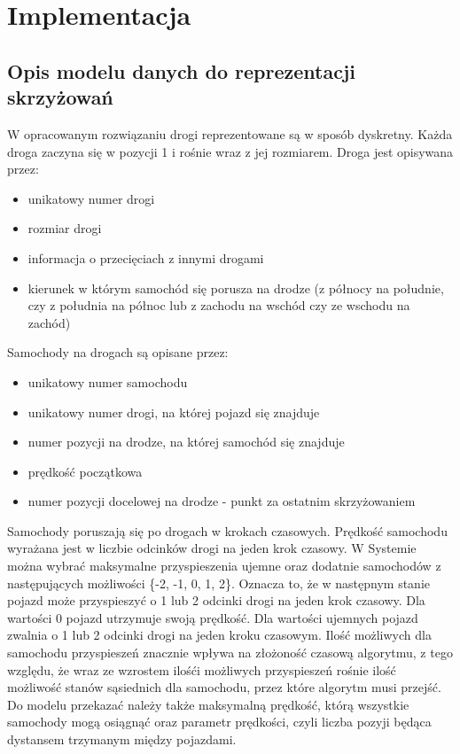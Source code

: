 \chapter{Implementacja} \label{chap:implementation}

\section{Opis modelu danych do reprezentacji skrzyżowań}

W opracowanym rozwiązaniu drogi reprezentowane są w sposób dyskretny. Każda droga zaczyna się w pozycji 1 i rośnie wraz z jej rozmiarem. Droga jest opisywana przez:
\begin{itemize}
\item unikatowy numer drogi
\item rozmiar drogi
\item informacja o przecięciach z innymi drogami
\item kierunek w którym samochód się porusza na drodze (z północy na południe, czy z południa na północ lub z zachodu na wschód czy ze wschodu na zachód)
\end{itemize}
Samochody na drogach są opisane przez:
\begin{itemize}
\item unikatowy numer samochodu
\item unikatowy numer drogi, na której pojazd się znajduje
\item numer pozycji na drodze, na której samochód się znajduje
\item prędkość początkowa
\item numer pozycji docelowej na drodze - punkt za ostatnim skrzyżowaniem
\end{itemize}
Samochody poruszają się po drogach w krokach czasowych. Prędkość samochodu wyrażana jest w liczbie odcinków drogi na jeden krok czasowy.
\newline
\indent
W Systemie można wybrać maksymalne przyspieszenia ujemne oraz dodatnie samochodów z następujących możliwości \{-2, -1, 0, 1, 2\}. Oznacza to, że w następnym stanie pojazd może przyspieszyć o 1 lub 2 odcinki drogi na jeden krok czasowy. Dla wartości 0 pojazd utrzymuje swoją prędkość. Dla wartości ujemnych pojazd zwalnia o 1 lub 2 odcinki drogi na jeden kroku czasowym. Ilość możliwych dla samochodu przyspieszeń znacznie wpływa na złożoność czasową algorytmu, z tego względu, że wraz ze wzrostem ilośći możliwych przyspieszeń rośnie ilość możliwość stanów sąsiednich dla samochodu, przez które algorytm musi przejść.        
\newline
\indent
Do modelu przekazać należy także maksymalną prędkość, którą wszystkie samochody mogą osiągnąć oraz parametr prędkości, czyli liczba pozyji będąca dystansem trzymanym między pojazdami.

